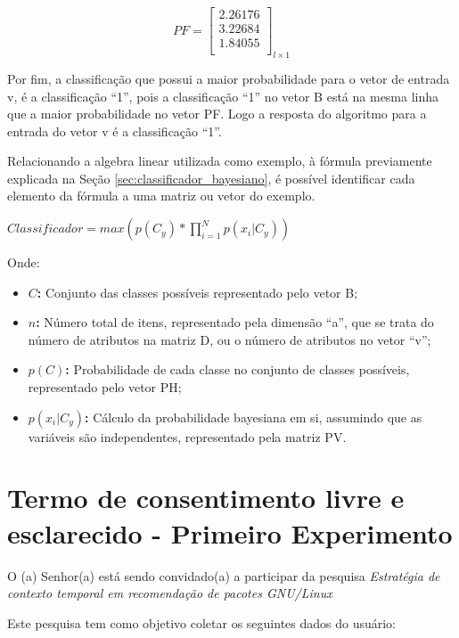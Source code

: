 \begin{anexosenv}
\begin{center}
$$PF=\left[
\begin{array}{c}
2.26176 \\
3.22684 \\
1.84055 \\
\end{array}
\right]_{l \times 1}
$$
\end{center}

Por fim, a classificação que possui a maior probabilidade para o vetor de
entrada v, é a classificação ``1'', pois a classificação ``1'' no vetor
B está na mesma linha que a maior probabilidade no vetor PF. Logo a resposta
do algoritmo para a entrada do vetor v é a classificação ``1''.

Relacionando a algebra linear utilizada como exemplo, à fórmula previamente
explicada na Seção \ref{sec:classificador_bayesiano}, é possível identificar cada
elemento da fórmula a uma matriz ou vetor do exemplo.

$Classificador = max(p(C_{y})*\prod_{i=1}^{N}p(x_{i}|C_{y}))$

Onde:

\begin{itemize}
    \item \textbf{$C$:} Conjunto das classes possíveis representado pelo vetor B;
    \item \textbf{$n$: } Número total de itens, representado pela dimensão ``a'',
    que se trata do número de atributos na matriz D, ou o número de atributos
    no vetor ``v'';
    \item \textbf{$p(C)$: } Probabilidade de cada classe no conjunto de classes
    possíveis, representado pelo vetor PH;
    \item \textbf{$p(x_{i}|C_{y})$: } Cálculo da probabilidade bayesiana
    em si, assumindo que as variáveis são independentes, representado pela
    matriz PV.
\end{itemize}


\chapter{Termo de consentimento livre e esclarecido - Primeiro Experimento}

O (a) Senhor(a) está sendo convidado(a) a participar da pesquisa
\textit{Estratégia de contexto temporal em recomendação de pacotes GNU/Linux}

Este pesquisa tem como objetivo coletar os seguintes dados do usuário:


\end{anexosenv}
